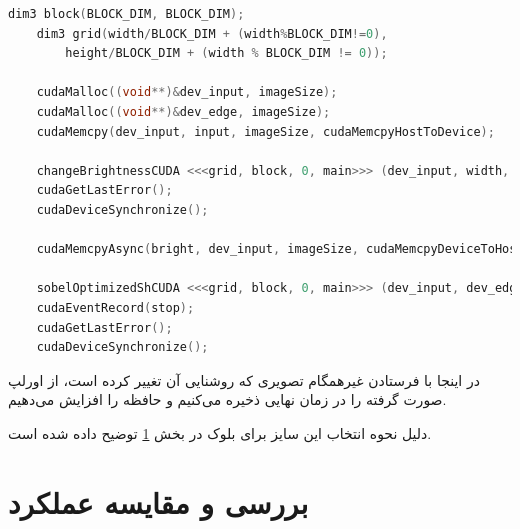 \documentclass{article}
\begin{document}
\begin{latin}
\begin{lstlisting}[language=C++]
	dim3 block(BLOCK_DIM, BLOCK_DIM);
	dim3 grid(width/BLOCK_DIM + (width%BLOCK_DIM!=0), 
		height/BLOCK_DIM + (width % BLOCK_DIM != 0));

	cudaMalloc((void**)&dev_input, imageSize);
	cudaMalloc((void**)&dev_edge, imageSize);
	cudaMemcpy(dev_input, input, imageSize, cudaMemcpyHostToDevice);

	changeBrightnessCUDA <<<grid, block, 0, main>>> (dev_input, width, height, brightness);
	cudaGetLastError();
	cudaDeviceSynchronize();

	cudaMemcpyAsync(bright, dev_input, imageSize, cudaMemcpyDeviceToHost, mem);

	sobelOptimizedShCUDA <<<grid, block, 0, main>>> (dev_input, dev_edge, width, height, threshold);
	cudaEventRecord(stop);
	cudaGetLastError();
	cudaDeviceSynchronize();
\end{lstlisting}
\end{latin}

در اینجا با فرستادن غیرهمگام تصویری که روشنایی آن تغییر کرده است، از اورلپ صورت گرفته
را در زمان نهایی ذخیره می‌کنیم و  حافظه را افزایش می‌دهیم.

دلیل نحوه انتخاب این سایز برای بلوک در بخش \ref{perf}  توضیح داده شده است.

\section{بررسی و مقایسه عملکرد}
\label{perf}
\end{document}
